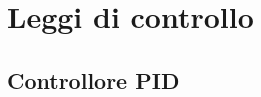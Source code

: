 \section{Leggi di controllo}
\subsection{Controllore PID}
\begin{figure}
	
\end{figure}

\begin{figure}
	
\end{figure}

\begin{figure}
	
\end{figure}